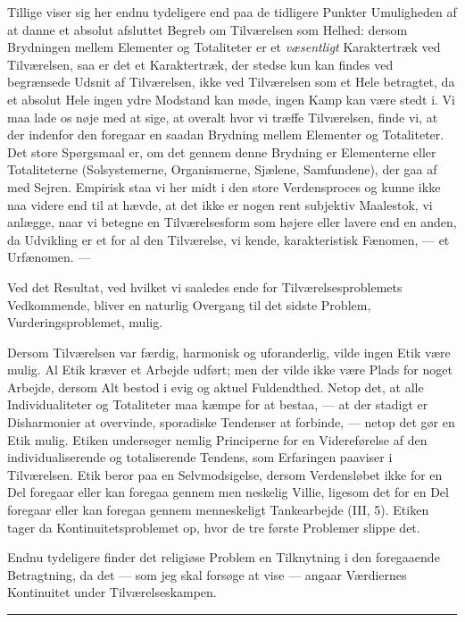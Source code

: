 \documentclass[12pt,a4paper,openany]{book}
\newcommand{\opage}[1]{\marginnote{\footnotesize\textit{[#1]}}}
\begin{document}
Tillige viser sig her endnu tydeligere end paa de tidligere Punkter Umuligheden
af at danne et absolut afsluttet Begreb om Tilværelsen som Helhed: dersom
Brydningen mellem Elementer og Totaliteter er et \textit{væsentligt}
Karaktertræk ved Tilværelsen, saa er det et Karaktertræk, der stedse kun kan
findes ved begrænsede Udsnit af Tilværelsen, ikke ved Tilværelsen som et Hele
betragtet, da et absolut Hele ingen ydre Modstand kan møde, ingen Kamp kan være
stedt i. Vi maa lade os nøje med at sige, at overalt hvor vi træffe
Tilværelsen, finde vi, at der indenfor den foregaar en saadan Brydning mellem
Elementer og Totaliteter. Det store Spørgsmaal er, om det gennem denne Brydning
er Elementerne eller Totaliteterne (Solsystemerne, Organismerne, Sjælene,
Samfundene), der gaa af med Sejren. Empirisk staa vi her midt i den store
Verdensproces og kunne ikke naa videre end til at hævde, at det ikke er nogen
rent subjektiv Maalestok, vi anlægge, naar vi betegne en Tilværelsesform som
højere eller lavere end en anden, da Udvikling er et for al den Tilværelse, vi
kende, karakteristisk Fænomen, --- et Urfænomen. ---

Ved det Resultat, ved hvilket vi saaledes ende for Tilværelsesproblemets
Vedkommende, bliver en naturlig Overgang til det sidste Problem,
Vurderingsproblemet, mulig.

Dersom Tilværelsen var færdig, harmonisk og uforanderlig, vilde ingen Etik være
mulig. Al Etik kræver et Arbejde udført; men der vilde ikke være Plads for
noget Arbejde, dersom Alt bestod i evig og aktuel Fuldendthed. Netop det, at
alle Individualiteter og Totaliteter maa kæmpe for at bestaa, --- at der
stadigt er Disharmonier at overvinde, sporadiske Tendenser at forbinde, ---
netop det gør en Etik mulig. Etiken undersøger nemlig Principerne for en
Videreførelse af den individualiserende og totaliserende Tendens, som
Erfaringen paaviser i Tilværelsen. Etik beror paa en Selvmodsigelse, dersom
Verdensløbet ikke for en Del foregaar eller kan foregaa gennem men%
\opage{69}neskelig Villie, ligesom det for en Del foregaar eller kan foregaa
gennem menneskeligt Tankearbejde (III, 5). Etiken tager da
Kontinuitetsproblemet op, hvor de tre første Problemer slippe det.

Endnu tydeligere finder det religiøse Problem en Tilknytning i den foregaaende
Betragtning, da det --- som jeg skal forsøge at vise --- angaar Værdiernes
Kontinuitet under Tilværelseskampen.

\begin{center}\rule{2cm}{0.4pt}\end{center}
\end{document}

